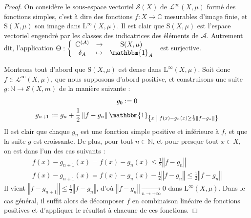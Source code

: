 \documentclass[a4paper,12pt]{article}
\newcommand{\N}{\mathbb{N}}
\newcommand{\C}{\mathbb{C}}
\newcommand{\norm}[1]{\left\Vert #1\right\Vert}
\newcommand{\set}[1]{\left\{ #1 \right\}}
\newcommand{\indic}{\mathbbm{1}}
\newcommand\fundef[3]{#1: \left\{\begin{array}{ccc}#2\\#3\end{array}\right.}
\newcommand{\tq}{\;\middle|\;}
\begin{document}
\begin{proof}
    On considère le sous-espace vectoriel $\mathscr{S}(X)$ de $\mathscr{L}^\infty(X, \mu)$ formé des fonctions simples, c'est à dire des
    fonctions $f:X\to\C$ mesurables d'image finie, et $\mathrm{S}(X, \mu)$ son image dans $\mathrm{L}^\infty(X, \mu)$. Il est clair que
    $\mathrm{S}(X, \mu)$ est l'espace vectoriel engendré par les classes des indicatrices des éléments de $\mathcal{A}$. Autrement dit, l'application
    $\fundef{\Theta}{\C^{(\mathcal{A})}&\to&\mathrm{S}(X, \mu)}{\delta_A&\mapsto&\indic_A}$ est surjective.
    
    Montrons tout d'abord que $\mathrm{S}(X, \mu)$ est dense dans $\mathrm{L}^\infty(X, \mu)$. Soit donc $f\in\mathscr{L}^\infty(X, \mu)$, 
    que nous supposons d'abord positive, et construisons une suite $g:\N\to \mathscr{S}(X, m)$ de la manière suivante :
    \begin{gather*}
        g_0 := 0 \\
        g_{n+1} := g_n + \frac12\norm{f - g_n}\indic_{\set{x\tq f(x) - g_n(x) \ge \frac12\norm{f - g_n}}}
    \end{gather*}
    Il est clair que chaque $g_n$ est une fonction simple positive et inférieure à $f$, et que la suite $g$ est croissante.
    De plus, pour tout $n\in\N$, et pour presque tout $x\in X$, on est dans l'un des cas suivants : 
    \begin{gather*}
        f(x)-g_{n+1}(x) = f(x)-g_n(x) \le \frac12\norm{f - g_n} \\
        f(x)-g_{n+1}(x) = f(x)-g_n(x)-\frac12\norm{f-g_n} \le \frac12\norm{f-g_n}
    \end{gather*}
    Il vient $\norm{f - g_{n+1}}\le\frac12\norm{f - g_n}$, d'où $\norm{f - g_n}\xrightarrow[n\to+\infty]{} 0$ dans $\mathrm{L}^\infty(X, \mu)$.
    Dans le cas général, il suffit alors de décomposer $f$ en combinaison linéaire de fonctions positives et d'appliquer 
    le résultat à chacune de ces fonctions. 


\end{proof}
\end{document}

